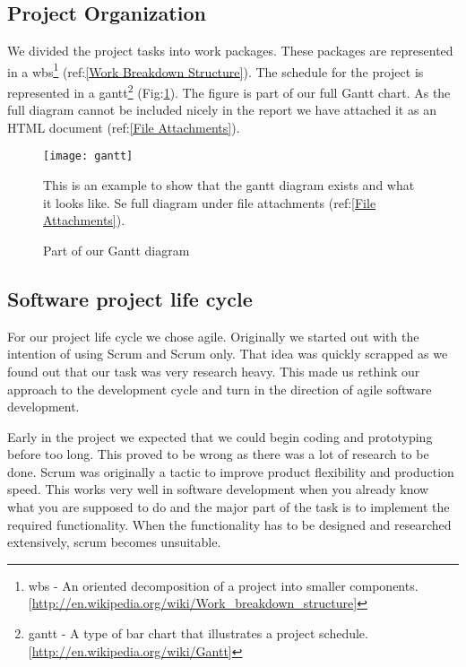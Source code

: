     \subsection{Project Organization}\label{Project Organization}
    
    We divided the project tasks into work packages. These packages are represented in a \gls{wbs}\footnote{\gls{wbs} - An oriented decomposition of a project into smaller components. [\url{http://en.wikipedia.org/wiki/Work_breakdown_structure}]} (ref:\ref{Work Breakdown Structure}). The schedule for the project is represented in a \gls{gantt}\footnote{\gls{gantt} - A type of bar chart that illustrates a project schedule. [\url{http://en.wikipedia.org/wiki/Gantt}]} (Fig:\ref{fig:gantt}). The figure is part of our full Gantt chart. As the full diagram cannot be included nicely in the report we have attached it as an HTML document (ref:\ref{File Attachments}).
     
        \begin{figure}[h]
            \centering
            \texttt{[image: gantt]}
            \caption{Part of our Gantt diagram} 
            This is an example to show that the gantt diagram exists and what it looks like. Se full diagram under file attachments (ref:\ref{File Attachments}).
            \label{fig:gantt}
        \end{figure}
    
    \subsection{Software project life cycle}\label{Software project life cycle}
    
    For our project life cycle we chose agile. Originally we started out with the intention of using Scrum and Scrum only. That idea was quickly scrapped as we found out that our task was very research heavy. This made us rethink our approach to the development cycle and turn in the direction of agile software development.
    
    Early in the project we expected that we could begin coding and prototyping before too long. This proved to be wrong as there was a lot of research to be done. Scrum was originally a tactic to improve product flexibility and production speed. This works very well in software development when you already know what you are supposed to do and the major part of the task is to implement the required functionality. When the functionality has to be designed and researched extensively, scrum becomes unsuitable. 
    
